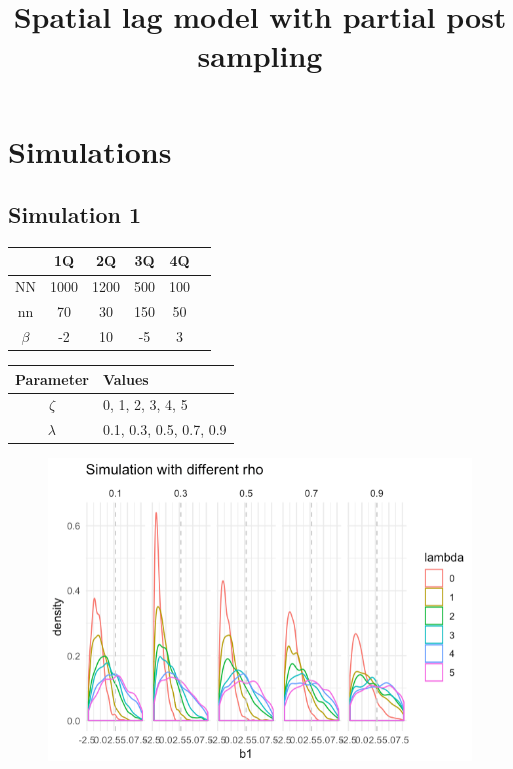 \documentclass{article}
\begin{document}
\title{Spatial lag model with partial post sampling}
\author{}
\date{}
\maketitle

\section{Simulations}
\subsection{Simulation 1}
\begin{table}[h!]
    \begin{tabular}{cccccc}
      \toprule
        & 1Q & 2Q &3Q & 4Q \\
      \midrule
         NN & 1000 & 1200 & 500 & 100 \\
         nn & 70 & 30 & 150 & 50 \\
         $\beta$ & -2 & 10 & -5 & 3 \\
      \bottomrule
      \end{tabular}
      \end{table}

      \begin{table}[h!]
        \begin{tabular}{cl}
          \toprule
           Parameter & Values \\
          \midrule
             $\zeta$ &  0, 1, 2, 3, 4, 5\\
             $\lambda$  & 0.1, 0.3, 0.5, 0.7, 0.9 \\
          \bottomrule
          \end{tabular}
          \end{table}

\begin{figure}[p]
            \centering
            \includegraphics[width=\textwidth]{img/distribution1.png}
\end{figure}
\end{document}
